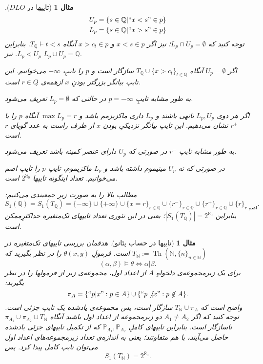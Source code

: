 \documentclass[12pt,a4paper]{report}
\theoremstyle{colorhead}
\newtheorem{mesal}[thm]{مثال}
\DeclareMathOperator{\Th}{Th}
\begin{document}
\begin{mesal}[تایپها در
$DLO$]
\begin{align*}
& U_p=\{s\in \mathbb{Q}|``x<s"\in p\}
\\
& 
L_p=\{s\in \mathbb{Q}|``x>s"\in p\}
\end{align*}
توجه کنید که
$L_p\cap U_p=\emptyset$؛
نیز اگر
$x<s\in p$
و
$x>c_t\in p$
آنگاه
$T_\mathbb{Q}\vdash t<s$.
بنابراین
$L_p<U_p$.
نیز
$L_p\cup U_p=\mathbb{Q}$.
\par 
اگر
$U_p=\emptyset$
آنگاه 
$T_\mathbb{Q}\cup \{x>c_t\}_{t\in \mathbb{Q}}$
سازگار است و 
$p$
را تایپِ 
$+\infty$
می‌خوانیم. این تایپ بیانگر بزرگتر بودنِ
$x$
ازهمه‌ی 
$r\in Q$
است.
\par 
به طور مشابه تایپِ
$p=-\infty$
در حالتی که 
$L_p=\emptyset$
تعریف می‌شود.
\par 
اگر هر دوی
$L_p,U_p$
ناتهی باشند و 
$L_p$
داری ماکزیزمم باشد و 
$\max L_p=r$
آنگاه 
$p$
را
با
$r^+$
نشان می‌دهیم. این تایپ بیانگر نزدیکیِ بودن
$x$
از طرف راست
به عدد گویای 
$r$
است. 
\par 
به طور مشابه تایپ
$r^-$
در صورتی که
$U_p$
دارای عنصر کمینه باشد تعریف می‌شود. 
\par 
در صورتی که نه
$U_p$
مینیموم داشته باشد و 
$L_p$
ماکزیموم، تایپ
$p$
را تایپ اصم می‌خوانیم. تعداد اینگونه تایپها
$2^{\aleph_0}$
است. 
\par 
مطالب بالا را به صورت زیر جمعبندی می‌کنیم:
\[
S_1(\mathbb{Q})=S_1(T_\mathbb{Q})=\{-\infty\}\cup \{+\infty\}\cup
\{x=r\}_{r\in \mathbb{Q}}\cup \{r^-\}_{r\in \mathbb{Q}}\cup \{r^+\}_{r\in \mathbb{Q}}\cup \{r\}_{\text{$r$ اصم}}.
\]
بنابراین
$|S_1(T_\mathbb{Q})|=2^{\aleph_0}$؛
یعنی در این تئوری تعداد تایپهای تک‌متغیره حداکثرِ‌ممکن است. 
\end{mesal}
\begin{mesal}[تایپها در حساب پئانو]
هدفمان بررسی تایپهای تک‌متغیره در 
$T_\mathbb{N}:=\Th(\mathbb{N}, \{n\}_{n\in \mathbb{N}})$
است. 
فرمولِ
$\theta(x,y)$
را در نظر بگیرید که
\[
(\alpha,\beta)\models \theta \Leftrightarrow \alpha|\beta.
\]
برای یک زیرمجموعه‌ی دلخواهِ
$A$
از اعداد اول، مجموعه‌ی زیر از فرمولها را در نظر بگیرید:
\[
\pi_A=\{``p|x": p\in A\}\cup \{``p\not|x":p\not\in A\}.
\]
واضح است که 
$T_\mathbb{N}\cup \pi_A$
سازگار است، پس مجموعه‌ی یادشده یک تایپ جزئی است. توجه کنید که اگر
$A_1\not=A_2$
دو زیرمجموعه از اعداد اول باشند آنگاه
$\pi_{A_1}\cup\pi_{A_2}\cup T_\mathbb{N}$
ناسازگار است. بنابراین تایپهای کاملِ
$\mathbb{P}_{A_1},\mathbb{P}_{A_2}$
که از تکمیل تایپهای جزئی یادشده حاصل می‌آیند، با هم متفاوتند؛ یعنی به اندازه‌ی تعداد زیرمجموعه‌های اعداد اول می‌توان تایپ کامل پیدا کرد. پس
\[
S_1(T_\mathbb{N})=2^{\aleph_0}.
\]
\end{mesal}
\end{document}
